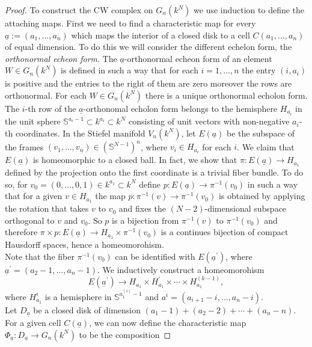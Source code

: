 \documentclass[a4paper,openany]{scrbook}
\begin{document}
\begin{proof}
To construct the CW complex on $G_n(k^N)$ we use induction to define the attaching maps. First we need to find a characteristic map for every $\underline{a}:=(a_1,\dots ,a_n)$ which maps the interior of a closed disk to a cell $C(a_1,\dots ,a_n)$ of equal dimension. To do this we will consider the different echelon form, the \textit{orthonormal echeon form}. The $\underline{a}$-orthonormal echeon form of an element $W\in G_n(k^N)$ is defined in such a way that for each $i=1,\dots , n$ the entry $(i,a_i)$ is positive and the entries to the right of them are zero moreover the rows are orthonormal. For each $W\in G_n(k^N)$ there is a unique orthonormal echolon form.\\ 
The $i$-th row of the $\underline{a}$-orthonomal echolon form belongs to the hemisphere $H_{a_i}$ in the unit sphere $\mathbb{S}^{a_i-1}\subset k^{a_i}\subset k^N$ consisting of unit vectors with non-negative $a_i$-th coordinates. In the Stiefel manifold $V_n(k^N)$, let $E(\underline{a})$ be the subspace of the frames $(v_1,\dots ,v_n)\in (\mathbb{S}^{N-1})^n$, where $v_i\in H_{a_i}$ for each $i$. We claim that $E(\underline{a})$ is homeomorphic to a closed ball. In fact, we show that  $\pi :E(\underline{a})\longrightarrow H_{a_1}$ defined by the projection onto the first coordinate is a trivial fiber bundle. To do so, for $v_0=(0,\dots ,0,1)\in  k^{a_1}\subset k^N$ define $p:E(\underline{a})\longrightarrow \pi^{-1}(v_0)$ in such a way that for a given $v\in H_{a_1}$ the map $p:\pi^{-1}(v)\longrightarrow \pi^{-1}(v_0)$ is obtained by applying the rotation that takes $v$ to $v_0$ and fixes the $(N-2)$-dimensional subspace orthogonal to $v$ and $v_0$. So $p$ is a bijection from $\pi^{-1}(v)$ to $\pi^{-1}(v_0)$ and therefore $\pi\times p :E(\underline{a})\longrightarrow H_{a_1}\times \pi^{-1}(v_0)$ is a continues bijection of compact Hausdorff spaces, hence a homeomorohism. \\
Note that the fiber $\pi^{-1}(v_0)$ can be identified with $E(\underline{a}^\prime)$, where $\underline{a}^\prime=(a_2-1,\dots ,a_n-1)$. We inductively construct a homeomorohism
$$
E(\underline{a}^\prime)\longrightarrow H_{a_1}\times H^\prime_{a_1}\times \cdots \times H^{(k-1)}_{a_1},
$$
where $H^{i}_{a_1}$ is a hemisphere in $\mathbb{S}^{{a}^{(i)}_1-1}$ and $a^{i}=(a_{i+1}-i,\dots ,a_n-i)$.\\
Let $D_{\underline{a}}$ be a closed disk of dimension $(a_1-1)+(a_2-2)+\cdots +(a_n-n)$. For a given cell $C(\underline{a})$, we can now define the characteristic map $\Phi_{\underline{a}}: D_{\underline{a}}\rightarrow G_n(k^N)$ to be the composition 

\end{proof}
\end{document}
